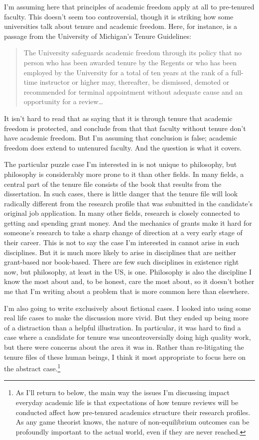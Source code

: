 I'm assuming here that principles of academic freedom apply at all to pre-tenured faculty. This doesn't seem too controversial, though it is striking how some universities talk about tenure and academic freedom. Here, for instance, is a passage from the University of Michigan's Tenure Guidelines:

\begin{quote}

The University safeguards academic freedom through its policy that no person who has been awarded tenure by the Regents or who has been employed by the University for a total of ten years at the rank of a full-time instructor or higher may, thereafter, be dismissed, demoted or recommended for terminal appointment without adequate cause and an opportunity for a review{\ldots} ~\citep{MichTenureA}
\end{quote}
It isn't hard to read that as saying that it is through tenure that academic freedom is protected, and conclude from that that faculty without tenure don't have academic freedom. But I'm assuming that conclusion is false; academic freedom does extend to untenured faculty. And the question is what it covers.

The particular puzzle case I'm interested in is not unique to philosophy, but philosophy is considerably more prone to it than other fields. In many fields, a central part of the tenure file consists of the book that results from the dissertation. In such cases, there is little danger that the tenure file will look radically different from the research profile that was submitted in the candidate's original job application. In many other fields, research is closely connected to getting and spending grant money. And the mechanics of grants make it hard for someone's research to take a sharp change of direction at a very early stage of their career. This is not to say the case I'm interested in cannot arise in such disciplines. But it is much more likely to arise in disciplines that are neither grant-based nor book-based. There are few such disciplines in existence right now, but philosophy, at least in the US, is one. Philosophy is also the discipline I know the most about and, to be honest, care the most about, so it doesn't bother me that I'm writing about a problem that is more common here than elsewhere.

I'm also going to write exclusively about fictional cases. I looked into using some real life cases to make the discussion more vivid. But they ended up being more of a distraction than a helpful illustration. In particular, it was hard to find a case where a candidate for tenure was uncontroversially doing high quality work, but there were concerns about the area it was in. Rather than re-litigating the tenure files of these human beings, I think it most appropriate to focus here on the abstract case.\footnote{As I'll return to below, the main way the issues I'm discussing impact everyday academic life is that expectations of how tenure reviews will be conducted affect how pre-tenured academics structure their research profiles. As any game theorist knows, the nature of non-equilibrium outcomes can be profoundly important to the actual world, even if they are never reached.}

